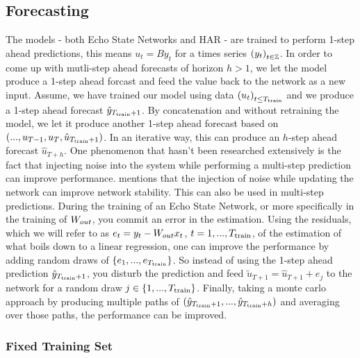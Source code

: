 \subsection{Forecasting}

The models - both Echo State Networks and HAR - are trained to perform 1-step ahead predictions, this means $u_t = By_t$ for a times series $\left(y_t\right)_{t\in\mathbb{Z}}$. In order to come up with mutli-step ahead forecasts of horizon $h > 1$, we let the model produce a 1-step ahead forcast and feed the value back to the network as a new input. Assume, we have trained our model using data $\left(u_t\right)_{t\leq T_{\text{train}}}$ and we produce a 1-step ahead forecast $\hat y_{T_{\text{train}}+1}$. By concatenation and without retraining the model, we let it produce another 1-step ahead forecast based on $\left(..., u_{T-1}, u_T, \hat u_{T_{\text{train}}+1}\right)$. In an iterative way, this can produce an $h$-step ahead forecast $\hat u_{T+h}$.
One phenomenon that hasn't been researched extensively is the fact that injecting noise into the system while performing a multi-step prediction can improve performance. \cite{Jaeger2005} mentions that the injection of noise while updating the network can improve network stability. This can also be used in multi-step predictions. During the training of an Echo State Network, or more specifically in the training of $W_{out}$, you commit an error in the estimation. Using the residuals, which we will refer to as $e_t = y_t - W_{out} x_t$, $t = 1, ..., T_{\text{train}}$, of the estimation of what boils down to a linear regression, one can improve the performance by adding random draws of $\left\{e_1,...,e_{T_{\text{train}}}\right\}$. So instead of using the 1-step ahead prediction $\hat y_{T_{\text{train}}+1}$, you disturb the prediction and feed $\tilde u_{T+1} = \hat u_{T+1} + e_{j}$ to the network for a random draw $j \in \left\{1,...,T_{\text{train}}\right\}$. Finally, taking a monte carlo approach by producing multiple paths of $\left(\hat y_{T_{\text{train}}+1},..., \hat y_{T_{\text{train}}+h}\right)$ and averaging over those paths, the performance can be improved.%

\subsubsection{Fixed Training Set}
\label{CH:Application:Forecasting:Fixed}

